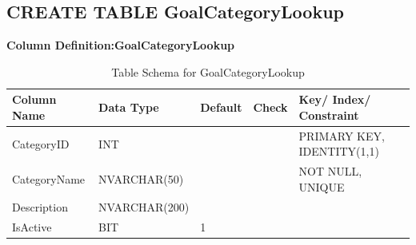 \documentclass[12pt,a4paper]{report}
\begin{document}
\subsection{CREATE TABLE GoalCategoryLookup}

\textbf{Column Definition:GoalCategoryLookup}


\begin{table}[h!]
\centering
\renewcommand{\arraystretch}{1.2} %
\begin{tabular}{|l|l|l|l|l|}
\hline
\textbf{Column Name} & \textbf{Data Type} & \textbf{Default} & \textbf{Check} & \textbf{Key/ Index/ Constraint} \\ \hline
CategoryID     & INT            &                  &                & PRIMARY KEY, IDENTITY(1,1)    \\ \hline
CategoryName   & NVARCHAR(50)   &                  &                & NOT NULL, UNIQUE              \\ \hline
Description    & NVARCHAR(200)  &                  &                &                               \\ \hline
IsActive       & BIT            & 1                &                &                               \\ \hline
\end{tabular}
\caption{Table Schema for GoalCategoryLookup}
\label{tab:goal_category_lookup}
\end{table}


\vspace{1cm}
\vspace{1cm}
\vspace{1cm}
\end{document}

